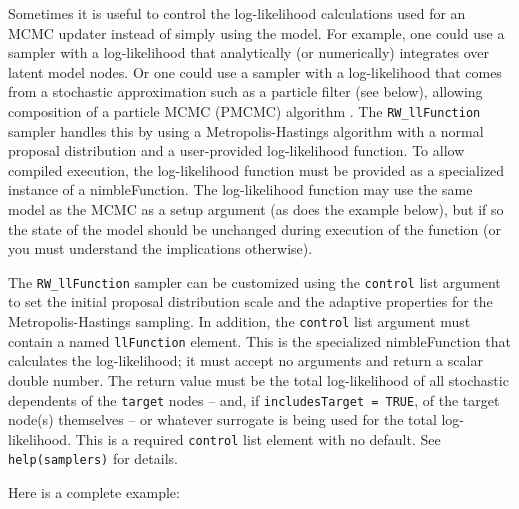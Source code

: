 \documentclass[12pt,oneside]{book}\usepackage[]{graphicx}\usepackage[]{color}
\def\cd#1{\texttt{#1}}
\begin{document}
Sometimes it is useful to control the log-likelihood calculations used for an MCMC updater instead of simply using the model.  For example, one could use a sampler with a log-likelihood that analytically (or numerically) integrates over latent model nodes.  Or one could use a sampler with a log-likelihood that comes from a stochastic approximation such as a particle filter (see below), allowing composition of a particle MCMC (PMCMC) algorithm \citep{Andrieu_Doucet_Holenstein_2010}.  The \cd{RW\_llFunction} sampler handles this by using a Metropolis-Hastings algorithm with a normal proposal distribution and a user-provided log-likelihood function.  To allow compiled execution, the log-likelihood function must be provided as a specialized instance of a nimbleFunction.  The log-likelihood function may use the same model as the MCMC as a setup argument (as does the example below), but if so the state of the model should be unchanged during execution of the function (or you must understand the implications otherwise).

The \cd{RW\_llFunction} sampler can be customized using the \cd{control} list argument to set the initial proposal distribution scale and the adaptive properties for the Metropolis-Hastings sampling.  In addition, the \cd{control} list argument must contain a named \cd{llFunction} element. This is the specialized nimbleFunction that calculates the log-likelihood; it must accept no arguments and return a scalar double number.  The return value must be the total log-likelihood of all stochastic dependents of the \cd{target} nodes -- and, if \cd{includesTarget = TRUE}, of the target node(s) themselves --  or whatever surrogate is being used for the total log-likelihood.  This is a required \cd{control} list element with no default.  See \cd{help(samplers)} for details. 

Here is a complete example:
\end{document}
